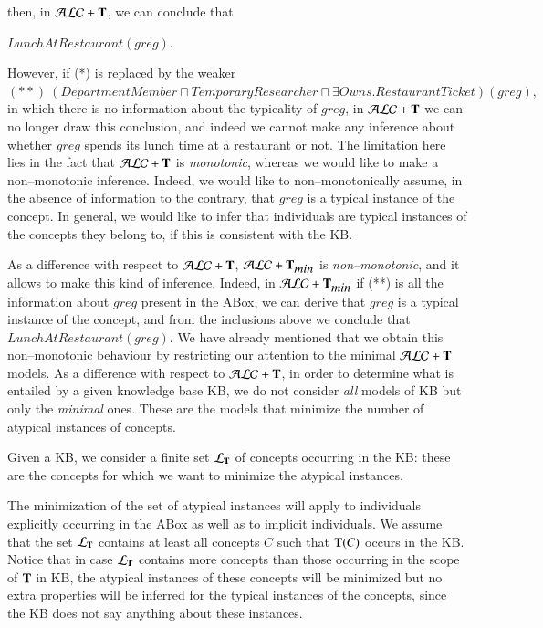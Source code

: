 \documentclass[a4paper, 11pt, oneside]{elsarticle}
\newcommand{\tip}{{\bf T}}
\newcommand{\alct}{\mathcal{ALC}+\tip}
\newcommand{\alctmin}{\mathcal{ALC}+\tip_{\mbox{\em min}}}
\newcommand{\ellet} {\mathcal{L}_{\bf T}}
\begin{document}
\noindent then, in $\alct$, we can conclude that

$\mathit{LunchAtRestaurant(\mathit{greg})}.$

\noindent However, if (*) is replaced by the weaker $(**)  \ (\mathit{DepartmentMember} \sqcap \mathit{TemporaryResearcher} \sqcap \exists \mathit{Owns}.
\mathit{RestaurantTicket})(\mathit{greg}),$ in which there is no information about the typicality of $\mathit{greg}$, in $\alct$ we can no longer draw this conclusion, and indeed we cannot make any inference about whether $\mathit{greg}$ spends its lunch time at a restaurant or not. The limitation here lies in the fact that $\alct$ is {\em monotonic}, whereas we would like to make a non--monotonic inference.
Indeed, we would like to non--monotonically assume, in the absence of information to the contrary, that $\mathit{greg}$ is a typical instance of the concept.
In general, we would like to infer that individuals are typical instances of the concepts they belong to, if this is consistent with the KB.

As a difference with respect to $\alct$, $\alctmin$ is {\em non--monotonic}, and it allows to make this kind of inference.
Indeed, in $\alctmin$ if (**) is all the information about $\mathit{greg}$ present in the ABox, we can derive that $\mathit{greg}$ is a typical instance of the concept, and from the inclusions above we conclude that $\mathit{LunchAtRestaurant(\mathit{greg})}.$
We have already mentioned that we obtain this non--monotonic behaviour by restricting our attention to the  minimal $\alct$ models.
As a difference with respect to $\alct$, in order to determine what is entailed by  a given knowledge base KB, we do not consider {\em all} models of KB but only the {\em minimal} ones.
These are the models that minimize the number of atypical instances of  concepts.

Given a KB, we consider a finite set $\ellet$ of concepts occurring in the KB: these are the concepts for which we want to minimize the atypical instances.

The minimization of the set of atypical instances will apply to individuals explicitly occurring in the ABox as well as to implicit individuals.
We assume that the set $\ellet$ contains at least all concepts $C$ such that $\tip(C)$ occurs in the KB.
Notice that in case $\ellet$ contains more concepts than those occurring in the scope of $\tip$ in KB, the atypical instances of these concepts will be minimized but no extra properties will be inferred for the typical instances of the concepts, since the KB does not say anything about these instances.
\end{document}
